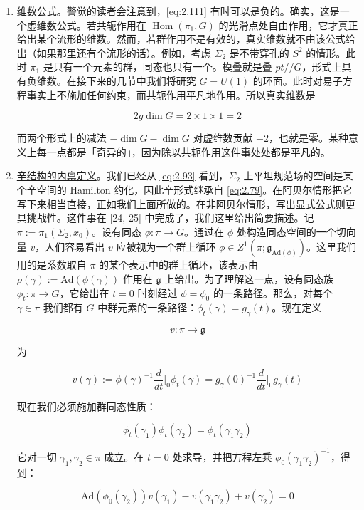 \begin{enumerate}
  \item \underline{维数公式}。警觉的读者会注意到，\eqref{eq:2.111} 有时可以是负的。确实，这是一个虚维数公式。若共轭作用在 $\operatorname{Hom}(\pi_1,G)$ 的光滑点处自由作用，它才真正给出某个流形的维数。然而，若群作用不是有效的，真实维数就不由该公式给出（如果那里还有个流形的话）。例如，考虑 $\Sigma_2$ 是不带穿孔的 $S^{2}$ 的情形。此时 $\pi_1$ 是只有一个元素的群，同态也只有一个。模叠就是叠 $pt//G$，形式上具有负维数。在接下来的几节中我们将研究 $G=U(1)$ 的环面。此时对易子方程事实上不施加任何约束，而共轭作用平凡地作用。所以真实维数是

  \begin{equation}
    2g\dim G=2\times 1\times 1=2
    \tag{2.119}
    \label{eq:2.119}
  \end{equation}

  而两个形式上的减法 $-\dim G-\dim G$ 对虚维数贡献 $-2$，也就是零。某种意义上每一点都是「奇异的」，因为除以共轭作用这件事处处都是平凡的。

  \item \underline{辛结构的内禀定义}。我们已经从 \eqref{eq:2.93} 看到，$\Sigma_2$ 上平坦规范场的空间是某个辛空间的 Hamilton 约化，因此辛形式继承自 \eqref{eq:2.79}。在阿贝尔情形把它写下来相当直接，正如我们上面所做的。在非阿贝尔情形，写出显式公式则更具挑战性。这件事在 [24, 25] 中完成了，我们这里给出简要描述。记 $\pi:=\pi_1(\Sigma_2,x_0)$。设有同态 $\phi:\pi\to G$。通过在 $\phi$ 处构造同态空间的一个切向量 $v$，人们容易看出 $v$ 应被视为一个群上循环 $\phi\in Z^{1}(\pi;\mathfrak{g}_{\mathrm{Ad}(\phi)})$。这里我们用的是系数取自 $\pi$ 的某个表示中的群上循环，该表示由 $\rho(\gamma):=\mathrm{Ad}(\phi(\gamma))$ 作用在 $\mathfrak{g}$ 上给出。为了理解这一点，设有同态族 $\phi_t:\pi\to G$，它给出在 $t=0$ 时刻经过 $\phi=\phi_0$ 的一条路径。那么，对每个 $\gamma\in\pi$ 我们都有 $G$ 中群元素的一条路径：$\phi_t(\gamma)=g_\gamma(t)$。现在定义

  \begin{equation}
    v:\pi\to\mathfrak{g}
    \tag{2.120}
    \label{eq:2.120}
  \end{equation}

  为

  \begin{equation}
    v(\gamma):=\phi(\gamma)^{-1}\frac{d}{dt}\Big|_{0}\phi_t(\gamma)=g_\gamma(0)^{-1}\frac{d}{dt}\Big|_{0}g_\gamma(t)
    \tag{2.121}
    \label{eq:2.121}
  \end{equation}

  现在我们必须施加群同态性质：

  \begin{equation}
    \phi_t(\gamma_1)\phi_t(\gamma_2)=\phi_t(\gamma_1\gamma_2)
    \tag{2.122}
    \label{eq:2.122}
  \end{equation}

  它对一切 $\gamma_1,\gamma_2\in\pi$ 成立。在 $t=0$ 处求导，并把方程左乘 $\phi_0(\gamma_1\gamma_2)^{-1}$，得到：

  \begin{equation}
    \mathrm{Ad}(\phi_0(\gamma_2))v(\gamma_1)-v(\gamma_1\gamma_2)+v(\gamma_2)=0
    \tag{2.123}
    \label{eq:2.123}
  \end{equation}
\end{enumerate}

